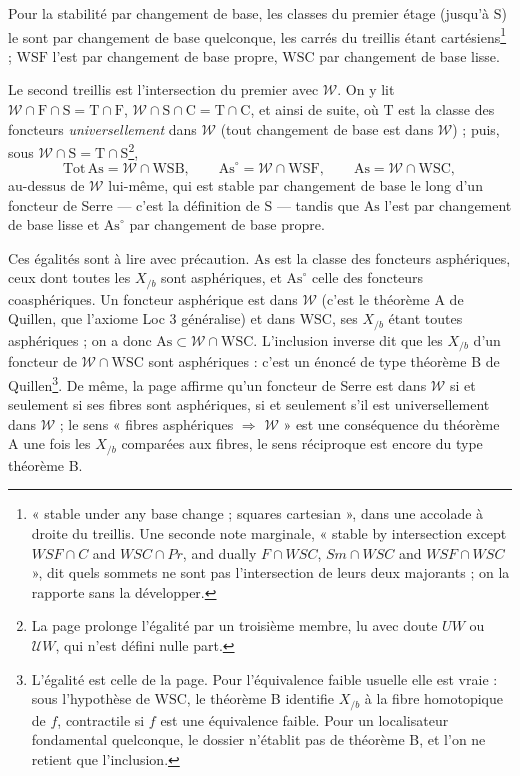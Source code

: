 \documentclass[11pt,a4paper]{article}
\begin{document}
Pour la stabilité par changement de base, les classes du premier étage
(jusqu'à $\mathrm{S}$) le sont par changement de base quelconque, les carrés
du treillis étant cartésiens\footnote{« stable under any base change ; squares
cartesian », dans une accolade à droite du treillis. Une seconde note marginale,
« stable by intersection except $WSF\cap C$ and $WSC\cap Pr$, and dually
$F\cap WSC$, $Sm\cap WSC$ and $WSF\cap WSC$ », dit quels sommets ne sont pas
l'intersection de leurs deux majorants ; on la rapporte sans la développer.} ;
$\mathrm{WSF}$ l'est par changement de base propre, $\mathrm{WSC}$ par
changement de base lisse.

Le second treillis est l'intersection du premier avec $\mathcal{W}$. On y lit
$\mathcal{W} \cap \mathrm{F} \cap \mathrm{S} = \mathrm{T} \cap \mathrm{F}$,
$\mathcal{W} \cap \mathrm{S} \cap \mathrm{C} = \mathrm{T} \cap \mathrm{C}$, et
ainsi de suite, où $\mathrm{T}$ est la classe des foncteurs
\emph{universellement} dans $\mathcal{W}$ (tout changement de base est dans
$\mathcal{W}$) ; puis, sous $\mathcal{W} \cap \mathrm{S} = \mathrm{T} \cap
\mathrm{S}$\footnote{La page prolonge l'égalité par un troisième membre, lu
avec doute $UW$ ou $\mathcal{U}W$, qui n'est défini nulle part.},
\[
\mathrm{Tot\,As} = \mathcal{W} \cap \mathrm{WSB}, \qquad
\mathrm{As}^{\circ} = \mathcal{W} \cap \mathrm{WSF}, \qquad
\mathrm{As} = \mathcal{W} \cap \mathrm{WSC},
\]
au-dessus de $\mathcal{W}$ lui-même, qui est stable par changement de base le
long d'un foncteur de Serre --- c'est la définition de $\mathrm{S}$ --- tandis
que $\mathrm{As}$ l'est par changement de base lisse et $\mathrm{As}^{\circ}$
par changement de base propre.

Ces égalités sont à lire avec précaution. $\mathrm{As}$ est la classe des
foncteurs asphériques, ceux dont toutes les $X_{/b}$ sont asphériques, et
$\mathrm{As}^{\circ}$ celle des foncteurs coasphériques. Un foncteur asphérique
est dans $\mathcal{W}$ (c'est le théorème A de Quillen, que l'axiome Loc 3
généralise) et dans $\mathrm{WSC}$, ses $X_{/b}$ étant toutes asphériques ;
on a donc $\mathrm{As} \subset \mathcal{W} \cap \mathrm{WSC}$. L'inclusion
inverse dit que les $X_{/b}$ d'un foncteur de $\mathcal{W} \cap \mathrm{WSC}$
sont asphériques : c'est un énoncé de type théorème B de
Quillen\footnote{L'égalité est celle de la page. Pour l'équivalence faible
usuelle elle est vraie : sous l'hypothèse de $\mathrm{WSC}$, le théorème B
identifie $X_{/b}$ à la fibre homotopique de $f$, contractile si $f$ est une
équivalence faible. Pour un localisateur fondamental quelconque, le dossier
n'établit pas de théorème B, et l'on ne retient que l'inclusion.}. De même,
la page affirme qu'un foncteur de Serre est dans $\mathcal{W}$ si et seulement
si ses fibres sont asphériques, si et seulement s'il est universellement dans
$\mathcal{W}$ ; le sens « fibres asphériques $\Rightarrow$ $\mathcal{W}$ » est
une conséquence du théorème A une fois les $X_{/b}$ comparées aux fibres, le
sens réciproque est encore du type théorème B.
\end{document}
